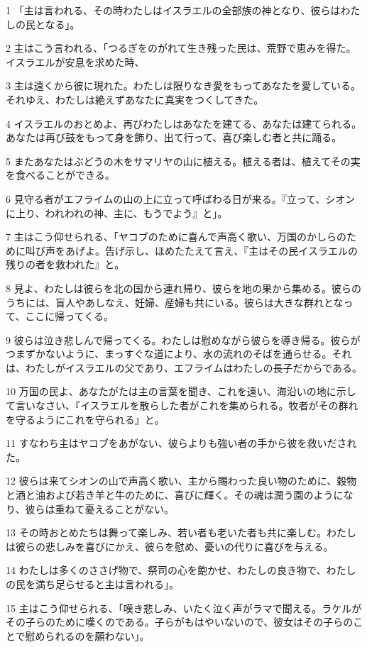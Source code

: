 \par 1 「主は言われる、その時わたしはイスラエルの全部族の神となり、彼らはわたしの民となる」。
\par 2 主はこう言われる、「つるぎをのがれて生き残った民は、荒野で恵みを得た。イスラエルが安息を求めた時、
\par 3 主は遠くから彼に現れた。わたしは限りなき愛をもってあなたを愛している。それゆえ、わたしは絶えずあなたに真実をつくしてきた。
\par 4 イスラエルのおとめよ、再びわたしはあなたを建てる、あなたは建てられる。あなたは再び鼓をもって身を飾り、出て行って、喜び楽しむ者と共に踊る。
\par 5 またあなたはぶどうの木をサマリヤの山に植える。植える者は、植えてその実を食べることができる。
\par 6 見守る者がエフライムの山の上に立って呼ばわる日が来る。『立って、シオンに上り、われわれの神、主に、もうでよう』と」。
\par 7 主はこう仰せられる、「ヤコブのために喜んで声高く歌い、万国のかしらのために叫び声をあげよ。告げ示し、ほめたたえて言え、『主はその民イスラエルの残りの者を救われた』と。
\par 8 見よ、わたしは彼らを北の国から連れ帰り、彼らを地の果から集める。彼らのうちには、盲人やあしなえ、妊婦、産婦も共にいる。彼らは大きな群れとなって、ここに帰ってくる。
\par 9 彼らは泣き悲しんで帰ってくる。わたしは慰めながら彼らを導き帰る。彼らがつまずかないように、まっすぐな道により、水の流れのそばを通らせる。それは、わたしがイスラエルの父であり、エフライムはわたしの長子だからである。
\par 10 万国の民よ、あなたがたは主の言葉を聞き、これを遠い、海沿いの地に示して言いなさい、『イスラエルを散らした者がこれを集められる。牧者がその群れを守るようにこれを守られる』と。
\par 11 すなわち主はヤコブをあがない、彼らよりも強い者の手から彼を救いだされた。
\par 12 彼らは来てシオンの山で声高く歌い、主から賜わった良い物のために、穀物と酒と油および若き羊と牛のために、喜びに輝く。その魂は潤う園のようになり、彼らは重ねて憂えることがない。
\par 13 その時おとめたちは舞って楽しみ、若い者も老いた者も共に楽しむ。わたしは彼らの悲しみを喜びにかえ、彼らを慰め、憂いの代りに喜びを与える。
\par 14 わたしは多くのささげ物で、祭司の心を飽かせ、わたしの良き物で、わたしの民を満ち足らせると主は言われる」。
\par 15 主はこう仰せられる、「嘆き悲しみ、いたく泣く声がラマで聞える。ラケルがその子らのために嘆くのである。子らがもはやいないので、彼女はその子らのことで慰められるのを願わない」。
